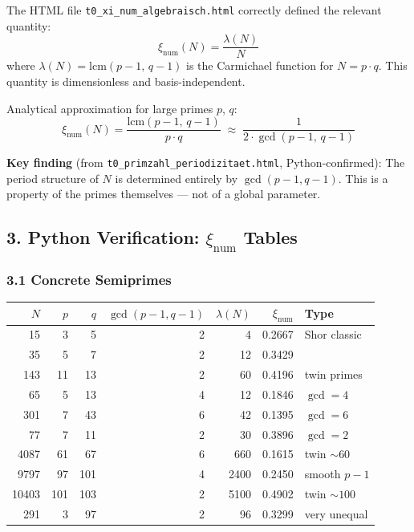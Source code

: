 The HTML file \texttt{t0\_xi\_num\_algebraisch.html} correctly defined the
relevant quantity:
\[
\xi_\text{num}(N) = \frac{\lambda(N)}{N}
\]
where $\lambda(N) = \text{lcm}(p-1,\, q-1)$ is the Carmichael function for
$N = p \cdot q$. This quantity is dimensionless and basis-independent.

Analytical approximation for large primes $p$, $q$:
\[
\xi_\text{num}(N) = \frac{\text{lcm}(p-1,\, q-1)}{p \cdot q}
\;\approx\; \frac{1}{2 \cdot \gcd(p-1,\, q-1)}
\]

\begin{mdframed}[style=ok]
\textbf{Key finding} (from \texttt{t0\_primzahl\_periodizitaet.html},
Python-confirmed): The period structure of $N$ is determined entirely by
$\gcd(p-1, q-1)$. This is a property of the primes themselves —
not of a global parameter.
\end{mdframed}

\subsection*{3. Python Verification: $\xi_\text{num}$ Tables}

\subsubsection*{3.1 Concrete Semiprimes}

\begin{center}
\begin{tabular}{rrrrrrl}
\toprule
$N$ & $p$ & $q$ & $\gcd(p{-}1,q{-}1)$ & $\lambda(N)$ & $\xi_\text{num}$ & Type \\
\midrule
15    & 3   & 5   & 2 & 4    & 0.2667 & Shor classic \\
35    & 5   & 7   & 2 & 12   & 0.3429 & \\
143   & 11  & 13  & 2 & 60   & 0.4196 & twin primes \\
65    & 5   & 13  & 4 & 12   & 0.1846 & $\gcd = 4$ \\
301   & 7   & 43  & 6 & 42   & 0.1395 & $\gcd = 6$ \\
77    & 7   & 11  & 2 & 30   & 0.3896 & $\gcd = 2$ \\
4087  & 61  & 67  & 6 & 660  & 0.1615 & twin ${\sim}60$ \\
9797  & 97  & 101 & 4 & 2400 & 0.2450 & smooth $p{-}1$ \\
10403 & 101 & 103 & 2 & 5100 & 0.4902 & twin ${\sim}100$ \\
291   & 3   & 97  & 2 & 96   & 0.3299 & very unequal \\
\bottomrule
\end{tabular}
\end{center}

